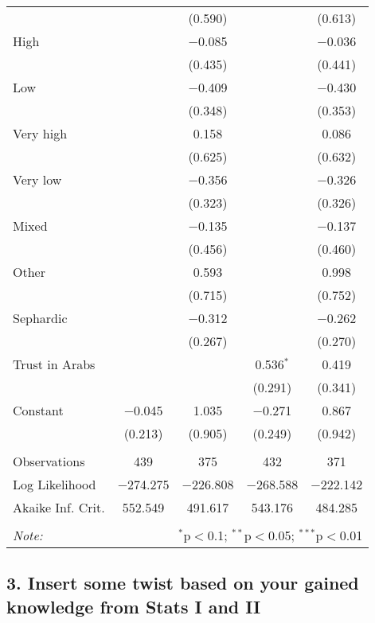 \documentclass[12pt,letterpaper]{article}
\begin{document}
\begin{table}[!htbp]
\begin{tabular}{@{\extracolsep{5pt}}lcccc}
		&  & (0.590) &  & (0.613) \\ 
		High &  & $-$0.085 &  & $-$0.036 \\ 
		&  & (0.435) &  & (0.441) \\ 
		Low &  & $-$0.409 &  & $-$0.430 \\ 
		&  & (0.348) &  & (0.353) \\ 
		Very high &  & 0.158 &  & 0.086 \\ 
		&  & (0.625) &  & (0.632) \\ 
		Very low &  & $-$0.356 &  & $-$0.326 \\ 
		&  & (0.323) &  & (0.326) \\ 
		Mixed &  & $-$0.135 &  & $-$0.137 \\ 
		&  & (0.456) &  & (0.460) \\ 
		Other &  & 0.593 &  & 0.998 \\ 
		&  & (0.715) &  & (0.752) \\ 
		Sephardic &  & $-$0.312 &  & $-$0.262 \\ 
		&  & (0.267) &  & (0.270) \\ 
		Trust in Arabs &  &  & 0.536$^{*}$ & 0.419 \\ 
		&  &  & (0.291) & (0.341) \\ 
		Constant & $-$0.045 & 1.035 & $-$0.271 & 0.867 \\ 
		& (0.213) & (0.905) & (0.249) & (0.942) \\ 
		\hline \\[-1.8ex] 
		Observations & 439 & 375 & 432 & 371 \\ 
		Log Likelihood & $-$274.275 & $-$226.808 & $-$268.588 & $-$222.142 \\ 
		Akaike Inf. Crit. & 552.549 & 491.617 & 543.176 & 484.285 \\ 
		\hline 
		\hline \\[-1.8ex] 
		\textit{Note:}  & \multicolumn{4}{r}{$^{*}$p$<$0.1; $^{**}$p$<$0.05; $^{***}$p$<$0.01} \\ 
	\end{tabular} 
\end{table} 







\newpage
\textbf{}

	\subsection*{3. Insert some twist based on your gained knowledge from Stats I and II}
	
\end{document}
